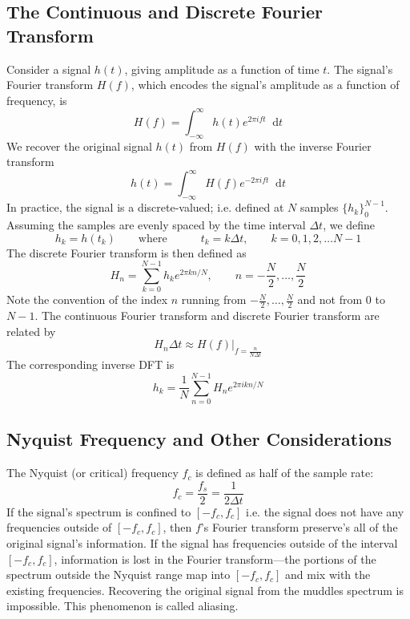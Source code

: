 \documentclass[11pt, a4paper]{article}
\newcommand{\diff}{\mathop{}\!\mathrm{d}} %
\newcommand{\eqtext}[1]{\qquad \text{#1} \qquad}
\begin{document}
\subsection{The Continuous and Discrete Fourier Transform}
Consider a signal $ h(t) $, giving amplitude as a function of time $ t $. The signal's Fourier transform $ H(f) $, which encodes the signal's amplitude as a function of frequency, is
\begin{equation*}
	H(f) = \int_{-\infty}^{\infty} h(t) e^{2\pi i ft} \diff t
\end{equation*}
We recover the original signal $ h(t) $ from $ H(f) $ with the inverse Fourier transform
\begin{equation*}
	h(t) = \int_{-\infty}^{\infty}H(f)e^{-2\pi i ft}\diff t
\end{equation*}
In practice, the signal is a discrete-valued; i.e. defined at $ N $ samples $ \{h_{k}\}_{0}^{N-1} $. Assuming the samples are evenly spaced by the time interval $ \Delta t $, we define
\begin{equation*}
	h_{k} = h(t_{k}) \eqtext{where} \quad t_{k} = k \Delta t, \qquad k = 0, 1, 2, \ldots N-1
\end{equation*}
The discrete Fourier transform is then defined as
\begin{equation}
	H_{n} = \sum_{k=0}^{N-1}h_{k}e^{2\pi k n /N}, \qquad n = -\frac{N}{2}, \ldots, \frac{N}{2} \label{dft:eq:DFT}
\end{equation}
Note the convention of the index $ n $ running from $ -\frac{N}{2}, \ldots, \frac{N}{2} $ and not from $ 0 $ to $ N -1 $. The continuous Fourier transform and discrete Fourier transform are related by
\begin{equation*}
	H_{n}\Delta t \approx H(f)\big |_{f = \frac{n}{N \Delta t}}
\end{equation*}
The corresponding inverse DFT is
\begin{equation}
	h_{k} = \frac{1}{N}\sum_{n=0}^{N-1}H_{n} e^{2\pi i kn/N} \label{dft:eq:IDFT}
\end{equation}

\subsection{Nyquist Frequency and Other Considerations}
The Nyquist (or critical) frequency $ f_{c} $ is defined as half of the sample rate:
\begin{equation*}
	f_{c} = \frac{f_{s}}{2} = \frac{1}{2 \Delta t}
\end{equation*}
If the signal's spectrum is confined to $ [-f_{c}, f_{c}] $ i.e. the signal does not have any frequencies outside of $ [-f_{c}, f_{c}] $, then $ f $'s Fourier transform preserve's all of the original signal's information. If the signal has frequencies outside of the interval $ [-f_{c}, f_{c}] $, information is lost in the Fourier transform---the portions of the spectrum outside the Nyquist range map into $ [-f_{c}, f_{c}] $ and mix with the existing frequencies. Recovering the original signal from the muddles spectrum is impossible.  This phenomenon is called aliasing.
\end{document}
